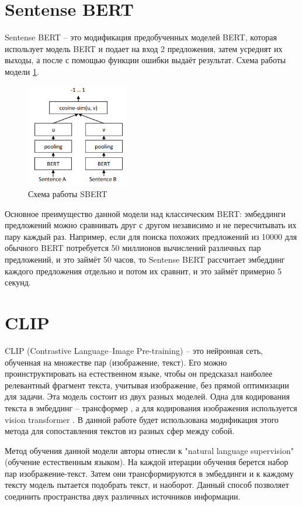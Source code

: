 \documentclass[PI, VKR]{HSEUniversity}
\begin{document}
\section{Sentense BERT}
\label{sec:orgbda5bd5}
Sentense BERT \autocite{reimers-2019-sentence-bert} -- это модификация предобученных моделей BERT, которая использует модель BERT и подает на вход 2 предложения, затем усреднят их выходы, а после с помощью функции ошибки выдаёт результат. Схема работы модели \ref{fig:sbert}.
\begin{figure}[hbp]
\centering
\includegraphics[width=0.4\textwidth]{img/sbert.png}
\caption{\label{fig:sbert}Схема работы SBERT}
\end{figure}
Основное преимущество данной модели над классическим BERT: эмбеддинги предложений можно сравнивать друг с другом независимо и не пересчитывать их пару каждый раз. Например, если для поиска похожих предложений из 10000 для обычного BERT потребуется 50 миллионов вычислений различных пар предложений, и это займёт 50 часов, то Sentense BERT рассчитает эмбеддинг каждого предложения отдельно и потом их сравнит, и это займёт примерно 5 секунд.
\section{CLIP}
\label{sec:org339bd3b}
CLIP (Contrastive Language–Image Pre-training)\autocite{radford2021learning} -- это нейронная сеть, обученная на множестве пар (изображение, текст). Его можно проинструктировать на естественном языке, чтобы он предсказал наиболее релевантный фрагмент текста, учитывая изображение, без прямой оптимизации для задачи. Эта модель состоит из двух разных моделей. Одна для кодирования текста в эмбеддинг -- трансформер \autocite{NIPS2017_3f5ee243}, а для кодирования изображения используется vision transformer \autocite{dosovitskiy2020image}. В данной работе будет использована модификация этого метода для сопоставления текстов из разных сфер между собой.

Метод обучения данной модели авторы отнесли к "natural language supervision" (обучение естественным языком). На каждой итерации обучения берется набор пар изображение-текст. Затем они трансформируются в эмбеддинги и к каждому тексту модель пытается подобрать текст, и наоборот. Данный способ позволяет соединить пространства двух различных источников информации.
\end{document}
